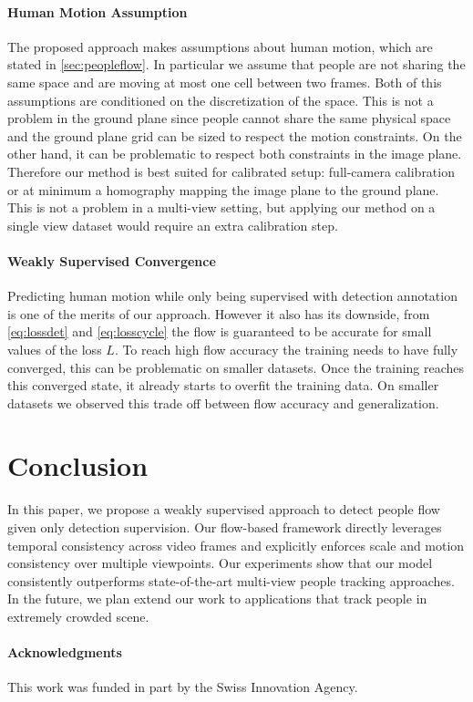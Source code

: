 \documentclass[10pt,twocolumn,letterpaper]{article}
\begin{document}
 \paragraph*{Human Motion Assumption} 
 
 The proposed approach makes assumptions about human motion, which are stated in \cref{sec:peopleflow}. 
 In particular we assume that people are not sharing the same space and are moving at most one cell between two frames. 
 Both of this assumptions are conditioned on the discretization of the space. This is not a problem in the ground plane since people cannot share the same physical space and the ground plane grid can be sized to respect the motion constraints. On the other hand, it can be problematic to respect both constraints in the image plane. Therefore our method is best suited for calibrated setup: 
 full-camera calibration or at minimum a homography mapping the image plane to the ground plane. This is not a problem in a multi-view setting, but applying our method on a single view dataset would require an extra calibration step.

\paragraph*{Weakly Supervised Convergence} 

Predicting human motion while only being supervised with detection annotation is one of the merits of our approach. However it also has its downside, from \cref{eq:lossdet} and \cref{eq:losscycle} the flow is guaranteed to be accurate for small values of the loss $L$.
To reach high flow accuracy the training needs to have fully converged, this can be problematic on smaller datasets. Once the training reaches this converged state, it already starts to overfit the training data. On smaller datasets we observed this trade off between flow accuracy and generalization.







  
\section{Conclusion}\label{sec:conclusion}
 In this paper, we propose a weakly supervised approach to detect people flow given only detection supervision. Our flow-based framework directly leverages temporal consistency across video frames and explicitly enforces scale and motion consistency over multiple viewpoints. Our experiments show that our model consistently outperforms state-of-the-art multi-view people tracking approaches. In the future, we plan extend our work to applications that track people in extremely crowded scene.  
 \paragraph{Acknowledgments} This work was funded in part by the Swiss Innovation Agency.

 
 \clearpage


{\small


}
\end{document}
